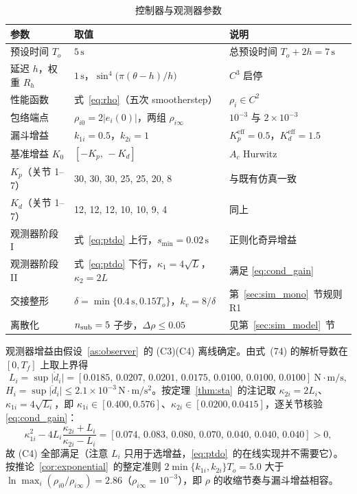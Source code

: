 \begin{table}[H]
\centering
\caption{控制器与观测器参数}
\label{tab:sim_params}
\small\begin{tabular}{p{3.2cm}p{5.8cm}p{4.2cm}}
\toprule
参数 & 取值 & 说明 \\
\midrule
预设时间 \(T_o\) & \(5\,\mathrm s\) & 总预设时间 \(T_o+2h=7\,\mathrm s\) \\
延迟 \(h\)，权重 \(R_h\) & \(1\,\mathrm s\)，\(\sin^4\!\bigl(\pi(\theta-h)/h\bigr)\) & \(C^{3}\) 启停 \\
性能函数 & 式~\eqref{eq:rho}（五次 smootherstep） & \(\rho_i\in C^{2}\) \\
包络端点 & \(\rho_{i0}=2\lvert e_i(0)\rvert\)，两组 \(\rho_{i\infty}\) & \(10^{-3}\) 与 \(2\times10^{-3}\) \\
漏斗增益 & \(k_{1i}=0.5\)，\(k_{2i}=1\) & \(K_p^{\mathrm{eff}}=0.5\)，\(K_d^{\mathrm{eff}}=1.5\) \\
基准增益 \(K_0\) & \([-K_p,\,-K_d]\) & \(A_c\) Hurwitz \\
\(K_p\)（关节 1--7） & 30, 30, 30, 25, 25, 20, 8 & 与既有仿真一致 \\
\(K_d\)（关节 1--7） & 12, 12, 12, 10, 10, 9, 4 & 同上 \\
观测器阶段 I & 式~\eqref{eq:ptdo} 上行，\(s_{\min}=0.02\,\mathrm s\) & 正则化奇异增益 \\
观测器阶段 II & 式~\eqref{eq:ptdo} 下行，\(\kappa_1=4\sqrt{L}\)，\(\kappa_2=2L\) & 满足 \eqref{eq:cond_gain} \\
交接整形 & \(\delta=\min\{0.4\,\mathrm s,0.15T_o\}\)，\(k_v=8/\delta\) & 第~\ref{sec:sim_mono}~节规则 R1 \\
离散化 & \(n_{\rm sub}=5\) 子步，\(\Delta\rho\le0.05\) & 见第~\ref{sec:sim_model}~节 \\
\bottomrule
\end{tabular}
\end{table}

观测器增益由假设~\ref{as:observer}~的 \textup{(C3)(C4)} 离线确定。由式~(74) 的解析导数在 \([0,T_f]\) 上取上界得
\[
L_i=\sup\lvert\dot d_i\rvert=[0.0185,\,0.0207,\,0.0201,\,0.0175,\,0.0100,\,0.0100,\,0.0100]\ \mathrm{N\cdot m/s},
\]
\(H_i=\sup\lvert\ddot d_i\rvert\le2.1\times10^{-3}\,\mathrm{N\cdot m/s^2}\)。按定理~\ref{thm:sta}~的注记取 \(\kappa_{2i}=2L_i\)、\(\kappa_{1i}=4\sqrt{L_i}\)，即 \(\kappa_{1i}\in[0.400,0.576]\)、\(\kappa_{2i}\in[0.0200,0.0415]\)，逐关节核验 \eqref{eq:cond_gain}：
\[
\kappa_{1i}^{2}-4L_i\frac{\kappa_{2i}+L_i}{\kappa_{2i}-L_i}
=[0.074,\,0.083,\,0.080,\,0.070,\,0.040,\,0.040,\,0.040]>0 ,
\]
故 \textup{(C4)} 全部满足（注意 \(L_i\) 只用于选增益，\eqref{eq:ptdo}~的在线实现并不需要它）。按推论~\ref{cor:exponential}~的整定准则 \(2\min\{k_{1i},k_{2i}\}T_o=5.0\) 大于 \(\ln\max_i(\rho_{i0}/\rho_{i\infty})=2.86\)（\(\rho_{i\infty}=10^{-3}\)），即 \(\rho\) 的收缩节奏与漏斗增益相容。

